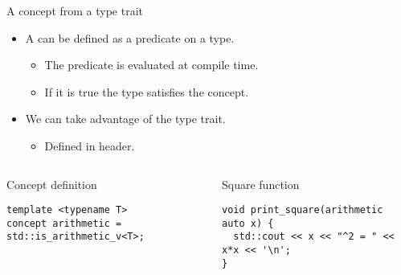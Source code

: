 \begin{frame}[t,fragile]{A concept from a type trait}
\begin{itemize}
  \item A  can be defined as a predicate on a type.
    \begin{itemize}
      \item The predicate is evaluated at compile time.
      \item If it is true the type satisfies the concept.
    \end{itemize}

  \item We can take advantage of the  type trait.
    \begin{itemize}
      \item Defined in  header.
    \end{itemize}
\end{itemize}

\begin{columns}[T]

\begin{block}{Concept definition}
\begin{lstlisting}
template <typename T>
concept arithmetic = std::is_arithmetic_v<T>;
\end{lstlisting}
\end{block}

\pause
{}
\begin{block}{Square function}
\begin{lstlisting}
void print_square(arithmetic auto x) {
  std::cout << x << "^2 = " << x*x << '\n';
}
\end{lstlisting}
\end{block}

\end{columns}
\end{frame}
